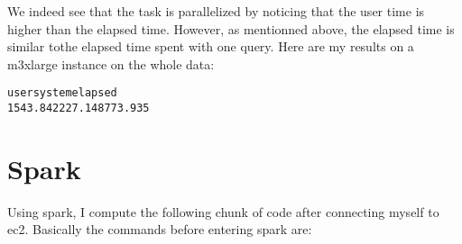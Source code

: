 \documentclass{llncs}\usepackage[]{graphicx}\usepackage[]{color}
\makeatletter
\newenvironment{kframe}{%
 \def\at@end@of@kframe{}%
 \ifinner\ifhmode%
  \def\at@end@of@kframe{\end{minipage}}%
  \begin{minipage}{\columnwidth}%
 \fi\fi%
 \def\FrameCommand##1{\hskip\@totalleftmargin \hskip-\fboxsep
 \colorbox{shadecolor}{##1}\hskip-\fboxsep
     \hskip-\linewidth \hskip-\@totalleftmargin \hskip\columnwidth}%
 \MakeFramed {\advance\hsize-\width
   \@totalleftmargin\z@ \linewidth\hsize
   \@setminipage}}%
 {\par\unskip\endMakeFramed%
 \at@end@of@kframe}
\newenvironment{knitrout}{}{} %
\makeatother
\begin{document}
We indeed see that the task is parallelized by noticing that the user time is higher than the elapsed time. However, as mentionned above, the elapsed time is similar tothe elapsed time spent with one query. Here are my results on a m3xlarge instance on the whole data:
\begin{knitrout}
\color{fgcolor}\begin{kframe}
\begin{alltt}
    user   system  elapsed 
1543.842  227.148  773.935 
\end{alltt}
\end{kframe}
\end{knitrout}

\section{Spark}
Using spark, I compute the following chunk of code after connecting myself to ec2. Basically the commands before entering spark are:
\end{document}
